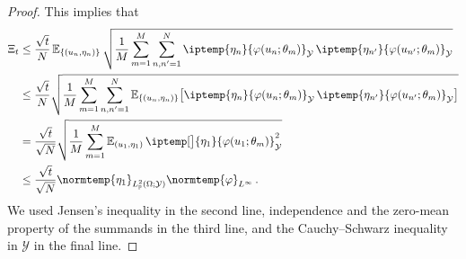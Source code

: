 \documentclass{article}
\theoremstyle{plain}
\theoremstyle{my_def}
\theoremstyle{my_rem}
\numberwithin{equation}{section}
\numberwithin{theorem}{section}%
\newcommand{\E}{\mathbb{E}}
\renewcommand{\P}{\mathbb{P}}
\newcommand{\cY}{\mathcal{Y}}
\newcommand{\ip}{\iptemp}
\newcommand{\norm}{\normtemp}
\renewcommand{\E}{\operatorname{\mathbb{E}}} %
\renewcommand{\phi}{\varphi}
\begin{document}
\begin{proof}
    This implies that
    \begin{align*}
        \Xi_t&\leq\frac{\sqrt{t}}{N}\E_{\{(u_n,\eta_n)\}}\sqrt{\frac{1}{M}\sum_{m=1}^M\sum_{n,n'=1}^N\ip{\eta_n}{\phi(u_n;\theta_m)}_{\cY}\,\ip{\eta_{n'}}{\phi(u_{n'};\theta_m)}_{\cY}}\\
        &\leq \frac{\sqrt{t}}{N}\sqrt{\frac{1}{M}\sum_{m=1}^M\sum_{n,n'=1}^N\E_{\{(u_n,\eta_n)\}}\bigl[\ip{\eta_n}{\phi(u_n;\theta_m)}_{\cY}\,\ip{\eta_{n'}}{\phi(u_{n'};\theta_m)}_{\cY}\bigr]}\\
        &= \frac{\sqrt{t}}{\sqrt{N}}\sqrt{\frac{1}{M}\sum_{m=1}^M\E_{(u_1,\eta_1)}\ip[\big]{\eta_1}{\phi(u_1;\theta_m)}_{\cY}^2}\\
        &\leq \frac{\sqrt{t}}{\sqrt{N}}\norm{\eta_1}_{L^2_\P(\Omega;\cY)}\norm{\phi}_{L^\infty}\,.
    \end{align*}
    We used Jensen's inequality in the second line, independence and the zero-mean property of the summands in the third line, and the Cauchy--Schwarz inequality in $\cY$ in the final line.
\end{proof}
\end{document}
